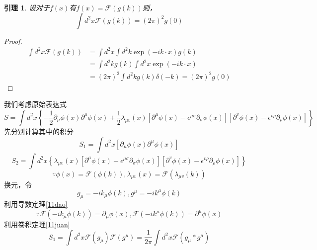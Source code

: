 \documentclass[a4paper]{ctexart}
\newtheorem{yinli}[subsection]{引理}
\begin{document}
\begin{yinli}\label{11delta}
    设对于$f(x)$有$f(x)=\mathcal{F}(g(k))$则，
    $$
        \int{d^2x\mathcal{F}\left( g\left( k \right) \right) }=\left( 2\pi \right) ^2g\left( 0 \right)
    $$
\end{yinli}
\begin{proof}
    $$
        \begin{aligned}
            \int{d^2x\mathcal{F}\left( g\left( k \right) \right)}
             & =\int{d^2x}\int{d^2k\exp \left( -ik\cdot x \right) g\left( k \right)}                                                \\
             & =\int{d^2kg\left( k \right)}\int{d^2x\exp \left( -ik\cdot x \right)}                                                 \\
             & =\left( 2\pi \right) ^2\int{d^2kg\left( k \right) \delta \left( -k \right) =}\left( 2\pi \right) ^2g\left( 0 \right)
        \end{aligned}
    $$

\end{proof}
我们考虑原始表达式
$$
    S=\int{d}^2x\left\{ -\frac{1}{2}\partial _{\mu}\phi \left( x \right) \partial ^{\mu}\phi \left( x \right) +\frac{1}{2}\lambda _{\mu v}\left( x \right) \left[ \partial ^{\mu}\phi \left( x \right) -\epsilon ^{\mu \sigma}\partial _{\sigma}\phi \left( x \right) \right] \left[ \partial ^v\phi \left( x \right) -\epsilon ^{v\rho}\partial _{\rho}\phi \left( x \right) \right] \right\}
$$
先分别计算其中的积分
$$
    S_1=\int{d}^2x\left[ \partial _{\mu}\phi \left( x \right) \partial ^{\mu}\phi \left( x \right) \right]
$$
$$
    S_2=\int{d}^2x\left\{ \lambda _{\mu v}\left( x \right) \left[ \partial ^{\mu}\phi \left( x \right) -\epsilon ^{\mu \sigma}\partial _{\sigma}\phi \left( x \right) \right] \left[ \partial ^v\phi \left( x \right) -\epsilon ^{v\rho}\partial _{\rho}\phi \left( x \right) \right] \right\}
$$
$$
    \because \phi \left( x \right) =\mathcal{F}\left( \phi \left( k \right) \right) ,\lambda _{\mu v}\left( x \right) =\mathcal{F}\left( \lambda _{\mu v}\left( k \right) \right)
$$
换元，令
$$
    g_{\mu}=-ik_{\mu}\phi \left( k \right) ,g^{\mu}=-ik^{\mu}\phi \left( k \right)
$$
利用导数定理\ref{11dao}
$$
    \because \mathcal{F}\left( -ik_{\mu}\phi \left( k \right) \right) =\partial _{\mu}\phi \left( x \right) ,\mathcal{F}\left( -ik^{\mu}\phi \left( k \right) \right) =\partial ^{\mu}\phi \left( x \right)
$$
利用卷积定理\ref{11juan}
$$
    S_1=\int{d}^2x\mathcal{F}\left( g_{\mu} \right) \mathcal{F}\left( g^{\mu} \right) =\frac{1}{2\pi}\int{d}^2x\mathcal{F}\left( g_{\mu}*g^{\mu} \right)
$$
\end{document}
